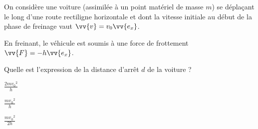 


\hauteurLargeurCadreReponse		{8mm}{1cm}
\initialisationEntrainement

On considère une voiture (assimilée à un point matériel de masse $m$) se déplaçant le long d'une route rectiligne horizontale et 
dont la vitesse initiale au début de la phase de freinage vaut
$\vv{v}=v_0\vv{e_x}$. 

En freinant, le véhicule est soumis à une force de frottement $\vv{F}=-h \vv{e_x}$.

\debutEntrainement


\begin{enonce}
	Quelle est l'expression de la distance d'arrêt $d$ de la voiture ?
	
	\begin{listeQCM3Colonnes}
	\item $\frac{2m{v_0}^2}{h}$
	\item $\frac{m{v_0}^2}{h}$
	\item $\frac{m{v_0}^2}{2h}$
	\end{listeQCM3Colonnes}
		
\end{enonce}

